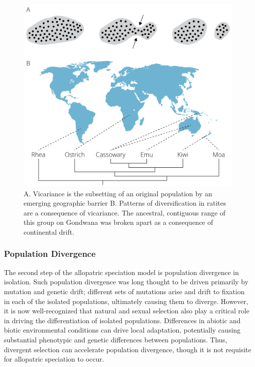\documentclass[
]{book}
\begin{document}
\begin{figure}
\includegraphics[width=1\linewidth]{images/vicariance} \caption{A. Vicariance is the subsetting of an original population by an emerging geographic barrier B. Patterns of diversification in ratites are a consequence of vicariance. The ancestral, contiguous range of this group on Gondwana was broken apart as a consequence of continental drift.}\label{fig:vicariance}
\end{figure}

\hypertarget{population-divergence}{%
\subsubsection*{Population Divergence}\label{population-divergence}}

The second step of the allopatric speciation model is population divergence in isolation. Such population divergence was long thought to be driven primarily by mutation and genetic drift; different sets of mutations arise and drift to fixation in each of the isolated populations, ultimately causing them to diverge. However, it is now well-recognized that natural and sexual selection also play a critical role in driving the differentiation of isolated populations. Differences in abiotic and biotic environmental conditions can drive local adaptation, potentially causing substantial phenotypic and genetic differences between populations. Thus, divergent selection can accelerate population divergence, though it is not requisite for allopatric speciation to occur.
\end{document}
